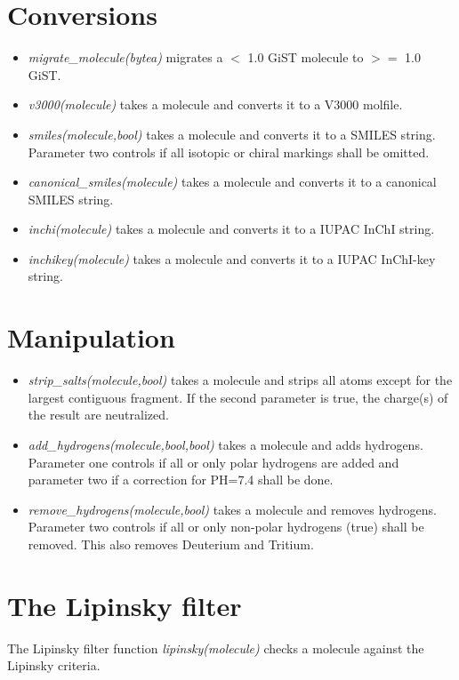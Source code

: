\documentclass[a4paper]{article}
\begin{document}
\section{Conversions}
\begin{itemize}
\item\textit{migrate\_molecule(bytea)} migrates a $<$ 1.0 GiST molecule to $>=$ 1.0 GiST.
\item\textit{v3000(molecule)} takes a molecule and converts it to a V3000 molfile.
\item\textit{smiles(molecule,bool)} takes a molecule and converts it to a SMILES string. Parameter two controls if all isotopic or chiral markings shall be omitted.
\item\textit{canonical\_smiles(molecule)} takes a molecule and converts it to a canonical SMILES string.
\item\textit{inchi(molecule)} takes a molecule and converts it to a IUPAC InChI string.
\item\textit{inchikey(molecule)} takes a molecule and converts it to a IUPAC InChI-key string.
\end{itemize}
\section{Manipulation}
\begin{itemize}
\item\textit{strip\_salts(molecule,bool)} takes a molecule and strips all atoms except for the largest contiguous fragment. If the second parameter is true, the charge(s) of the result are neutralized.
\item\textit{add\_hydrogens(molecule,bool,bool)} takes a molecule and adds hydrogens. Parameter one controls if  all or only polar hydrogens are added and parameter two if a correction for PH=7.4 shall be done.
\item\textit{remove\_hydrogens(molecule,bool)} takes a molecule and removes hydrogens. Parameter two controls if all or only non-polar hydrogens (true) shall be removed. This also removes Deuterium and Tritium.
\end{itemize}
\section{The Lipinsky filter}
The Lipinsky filter function \textit{lipinsky(molecule)} checks a molecule against the Lipinsky criteria.
\end{document}
